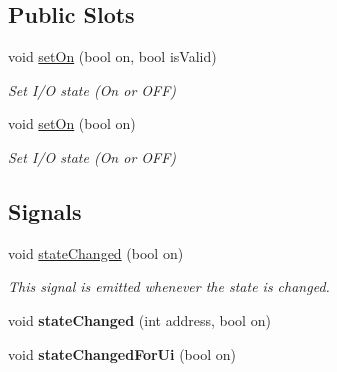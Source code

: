 \subsection*{Public Slots}
\begin{DoxyCompactItemize}
\item 
void \hyperlink{classmdt_digital_io_ae43db36b2d9f2c3d38cdd97e2ea84bda}{setOn} (bool on, bool isValid)
\begin{DoxyCompactList}\small\item\em Set I/O state (On or OFF) \end{DoxyCompactList}\item 
void \hyperlink{classmdt_digital_io_a88308968532c1e23f695c43a62a3be40}{setOn} (bool on)
\begin{DoxyCompactList}\small\item\em Set I/O state (On or OFF) \end{DoxyCompactList}\end{DoxyCompactItemize}
\subsection*{Signals}
\begin{DoxyCompactItemize}
\item 
\hypertarget{classmdt_digital_io_a69c20119906682c0bd90833598127328}{
void \hyperlink{classmdt_digital_io_a69c20119906682c0bd90833598127328}{stateChanged} (bool on)}
\label{classmdt_digital_io_a69c20119906682c0bd90833598127328}

\begin{DoxyCompactList}\small\item\em This signal is emitted whenever the state is changed. \end{DoxyCompactList}\item 
\hypertarget{classmdt_digital_io_a0bb6637d6ee81c7c3310b04f7fb743a4}{
void {\bfseries stateChanged} (int address, bool on)}
\label{classmdt_digital_io_a0bb6637d6ee81c7c3310b04f7fb743a4}

\item 
\hypertarget{classmdt_digital_io_ab50657b37b4915bd142aa0f22f45fd41}{
void {\bfseries stateChangedForUi} (bool on)}
\label{classmdt_digital_io_ab50657b37b4915bd142aa0f22f45fd41}

\end{DoxyCompactItemize}
